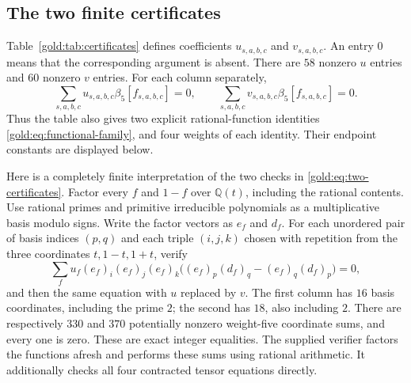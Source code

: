 \subsection{The two finite certificates}

Table~\ref{gold:tab:certificates} defines coefficients $u_{s,a,b,c}$
and $v_{s,a,b,c}$.  An entry $0$ means that the corresponding argument
is absent.  There are $58$ nonzero $u$ entries and $60$ nonzero $v$
entries.  For each column separately,
\begin{equation}
 \sum_{s,a,b,c}u_{s,a,b,c}\beta_5[f_{s,a,b,c}]=0,
 \qquad
 \sum_{s,a,b,c}v_{s,a,b,c}\beta_5[f_{s,a,b,c}]=0.
 \label{gold:eq:two-certificates}
\end{equation}
Thus the table also gives two explicit rational-function identities
\eqref{gold:eq:functional-family}, and four weights of each identity.
Their endpoint constants are displayed below.

Here is a completely finite interpretation of the two checks in
\eqref{gold:eq:two-certificates}.  Factor every $f$ and $1-f$ over
$\mathbb Q(t)$, including the rational contents.  Use rational primes
and primitive irreducible polynomials as a multiplicative basis modulo
signs.  Write the factor vectors as $e_f$ and $d_f$.  For each unordered
pair of basis indices $(p,q)$ and each triple $(i,j,k)$ chosen with
repetition from the three coordinates $t,1-t,1+t$, verify
\begin{equation}
 \sum_f u_f(e_f)_i(e_f)_j(e_f)_k
 \bigl((e_f)_p(d_f)_q-(e_f)_q(d_f)_p\bigr)=0,
 \label{gold:eq:finite-coordinate-check}
\end{equation}
and then the same equation with $u$ replaced by $v$.
The first column has $16$ basis coordinates, including the prime $2$;
the second has $18$, also including $2$.  There are respectively
$330$ and $370$ potentially nonzero weight-five coordinate sums, and
every one is zero.  These are exact integer equalities.
The supplied verifier factors the functions afresh and performs these
sums using rational arithmetic.  It additionally checks all four
contracted tensor equations directly.


